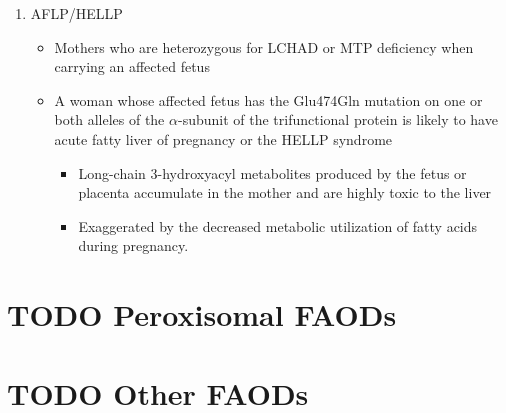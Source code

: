 \documentclass{scrartcl}
\begin{document}
\begin{enumerate}
\item AFLP/HELLP
\label{sec:org9cbf7f3}
\begin{itemize}
\item Mothers who are heterozygous for LCHAD or MTP deficiency when
carrying an affected fetus
\item A woman whose affected fetus has the Glu474Gln mutation on one or
both alleles of the \(\alpha\)-subunit of the trifunctional protein is
likely to have acute fatty liver of pregnancy or the HELLP syndrome 
\begin{itemize}
\item Long-chain 3-hydroxyacyl metabolites produced by the fetus or
placenta accumulate in the mother and are highly toxic to the liver
\item Exaggerated by the decreased metabolic utilization of fatty acids
during pregnancy.
\end{itemize}
\end{itemize}
\end{enumerate}

\section{{\bfseries\sffamily TODO} Peroxisomal FAODs}
\label{sec:orge1d5cc5}
\section{{\bfseries\sffamily TODO} Other FAODs}
\label{sec:org4681925}
\end{document}
